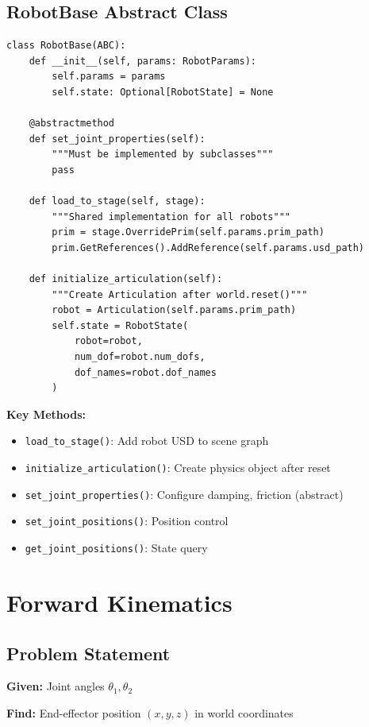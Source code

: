 \documentclass[11pt,a4paper]{article}
\begin{document}
\subsection{RobotBase Abstract Class}

\begin{lstlisting}
class RobotBase(ABC):
    def __init__(self, params: RobotParams):
        self.params = params
        self.state: Optional[RobotState] = None
    
    @abstractmethod
    def set_joint_properties(self):
        """Must be implemented by subclasses"""
        pass
    
    def load_to_stage(self, stage):
        """Shared implementation for all robots"""
        prim = stage.OverridePrim(self.params.prim_path)
        prim.GetReferences().AddReference(self.params.usd_path)
    
    def initialize_articulation(self):
        """Create Articulation after world.reset()"""
        robot = Articulation(self.params.prim_path)
        self.state = RobotState(
            robot=robot,
            num_dof=robot.num_dofs,
            dof_names=robot.dof_names
        )
\end{lstlisting}

\textbf{Key Methods:}
\begin{itemize}
    \item \texttt{load\_to\_stage()}: Add robot USD to scene graph
    \item \texttt{initialize\_articulation()}: Create physics object after reset
    \item \texttt{set\_joint\_properties()}: Configure damping, friction (abstract)
    \item \texttt{set\_joint\_positions()}: Position control
    \item \texttt{get\_joint\_positions()}: State query
\end{itemize}

\section{Forward Kinematics}

\subsection{Problem Statement}

\textbf{Given:} Joint angles $\theta_1, \theta_2$

\textbf{Find:} End-effector position $(x, y, z)$ in world coordinates
\end{document}
